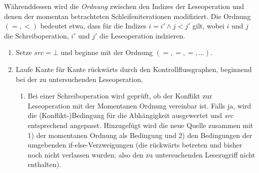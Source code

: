 \documentclass[a4paper,10pt]{article}
\begin{document}
Währenddessen wird die \textit{Ordnung} zwischen den Indizes der Leseoperation und denen der momentan betrachteten Schleifeniterationen modifiziert. Die Ordnung $(=,<)$ bedeutet etwa, dass für die Indizes $i=i'\wedge j<j'$ gilt, wobei $i$ und $j$ die Schreiboperation, $i'$ und $j'$ die Leseoperation indzieren.
\begin{enumerate}
    \item Setze $\mathit{src}={\bot}$ und beginne mit der Ordnung $(=,=,=,\ldots)$.
    \item Laufe Kante für Kante rückwärts durch den Kontrollflussgraphen, beginnend bei der zu untersuchenden Leseoperation.
        \begin{enumerate}
            \item Bei einer Schreiboperation wird geprüft, ob der Konflikt zur Leseoperation mit der Momentanen Ordnung vereinbar ist. Falls ja, wird die (Konflikt-)Bedingung für die Abhängigkeit ausgewertet und \textit{src} entsprechend angepasst.
            Hinzugefügt wird die neue Quelle zusammen mit 1) der momentanen Ordnung als Bedingung und 2) den Bedingungen der umgebenden if-else-Verzweigungen (die rückwärts betreten und bisher noch nicht verlassen wurden; also den zu untersuchenden Lesezugriff nicht enthalten).


\end{enumerate}
\end{enumerate}
\end{document}
